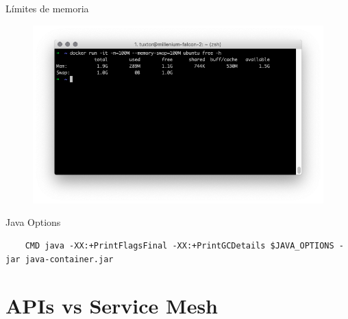 \documentclass[aspectratio=169]{beamer}
\begin{document}
\begin{frame}{Límites de memoria}
    \begin{figure}
        \centering
        \includegraphics[width=0.9\linewidth]{Images/dockermem.png}
        \label{fig:container}
    \end{figure}
\end{frame}

\begin{frame}[fragile]{Java Options}
    \begin{lstlisting}
    CMD java -XX:+PrintFlagsFinal -XX:+PrintGCDetails $JAVA_OPTIONS -jar java-container.jar
    \end{lstlisting}
\end{frame}






{
    \section{APIs vs Service Mesh}
}
\end{document}
